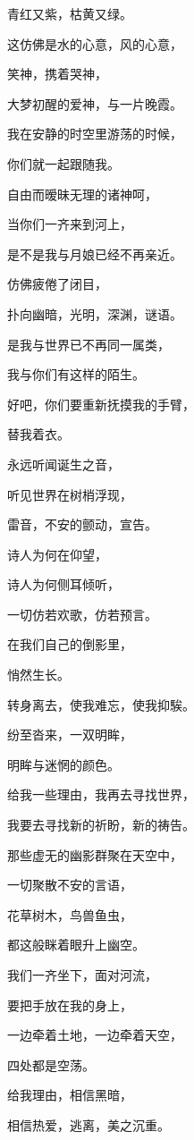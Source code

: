 \documentclass[UTF8]{article}
\begin{document}
\par 青红又紫，枯黄又绿。
\par 这仿佛是水的心意，风的心意，
\par 笑神，携着哭神，
\par 大梦初醒的爱神，与一片晚霞。
\par 我在安静的时空里游荡的时候，
\par 你们就一起跟随我。
\par 自由而暧昧无理的诸神呵，
\par 当你们一齐来到河上，
\par 是不是我与月娘已经不再亲近。
\par 仿佛疲倦了闭目，
\par 扑向幽暗，光明，深渊，谜语。
\par 是我与世界已不再同一属类，
\par 我与你们有这样的陌生。
\par 好吧，你们要重新抚摸我的手臂，
\par 替我着衣。
\par 永远听闻诞生之音，
\par 听见世界在树梢浮现，
\par 雷音，不安的颤动，宣告。
\par 诗人为何在仰望，
\par 诗人为何侧耳倾听，
\par 一切仿若欢歌，仿若预言。
\par 在我们自己的倒影里，
\par 悄然生长。
\\[0.6cm]
\par 转身离去，使我难忘，使我抑騃。
\par 纷至沓来，一双明眸，
\par 明眸与迷惘的颜色。
\par 给我一些理由，我再去寻找世界，
\par 我要去寻找新的祈盼，新的祷告。
\par 那些虚无的幽影群聚在天空中，
\par 一切聚散不安的言语，
\par 花草树木，鸟兽鱼虫，
\par 都这般眯着眼升上幽空。
\par 我们一齐坐下，面对河流，
\par 要把手放在我的身上，
\par 一边牵着土地，一边牵着天空，
\par 四处都是空荡。
\par 给我理由，相信黑暗，
\par 相信热爱，逃离，美之沉重。
\end{document}
